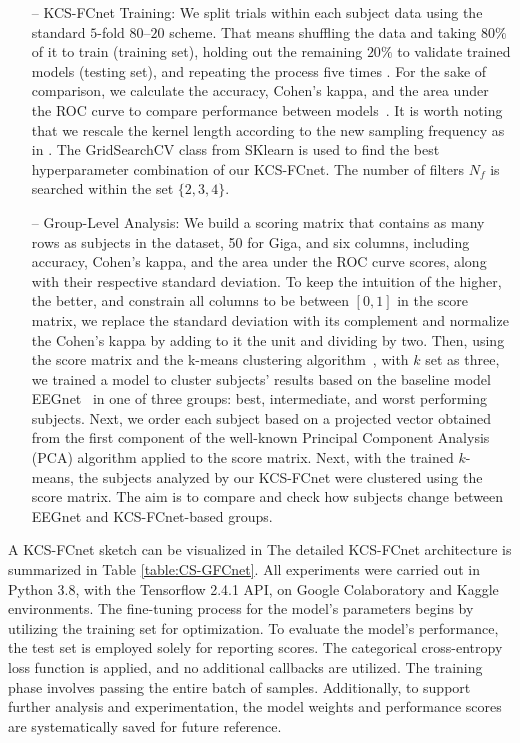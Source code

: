 \begin{itemize}
    \item[--] {{KCS-FCnet Training:}} We split trials within each subject data using the standard $5$-{fold} $80${--}$20$ scheme. That means shuffling the data and taking $80\%$ of it to train (training set), holding out the remaining $20\%$ to validate trained models (testing set), and repeating the process five times \cite{schirrmeister2017deep}. For the sake of comparison, we calculate the accuracy, Cohen's kappa, and the area under the ROC curve to compare performance between models~\cite{warrens2015five,geron2022hands}. It is worth noting that we rescale the kernel length according to the new sampling frequency as in \cite{lawhern2018eegnet}. The GridSearchCV class from SKlearn is used to find the best hyperparameter combination of our KCS-FCnet. The number of filters $N_f$ is searched within the set $\{2,3,4\}$.
    
    \item[--] {{Group-Level Analysis:}}  We build a scoring matrix that contains as many rows as subjects in the dataset, 50 for Giga, and six columns, including accuracy, Cohen's kappa, and the area under the ROC curve scores, along with their respective standard deviation. To keep the intuition of the higher, the better, and constrain all columns to be between $[0,1]$ in the score matrix, we replace the standard deviation with its complement and normalize the Cohen's kappa by adding to it the unit and dividing by two. Then, using the score matrix and the k-means clustering algorithm~\cite{geron2022hands}, with $k$ set as three, we trained a model to cluster subjects' results based on the baseline model EEGnet~\cite{lawhern2018eegnet} in one of three groups: best, intermediate, and worst performing subjects. Next, we order each subject based on a projected vector obtained from the first component of the well-known Principal Component Analysis (PCA) algorithm applied to the score matrix. Next, with the trained $k$-means, the subjects analyzed by our KCS-FCnet were clustered using the score matrix. The aim is to compare and check how subjects change between EEGnet and KCS-FCnet-based groups. 
\end{itemize}    
	
A KCS-FCnet sketch can be visualized in  The detailed KCS-FCnet architecture is summarized in Table \ref{table:CS-GFCnet}. All experiments were carried out in{ Python 3.8}, with the {Tensorflow 2.4.1 API}, on Google Colaboratory and Kaggle environments. The fine-tuning process for the model's parameters begins by utilizing the training set for optimization. To evaluate the model's performance, the test set is employed solely for reporting scores. The categorical cross-entropy loss function is applied, and no additional callbacks are utilized. The training phase involves passing the entire batch of samples. Additionally, to support further analysis and experimentation, the model weights and performance scores are systematically saved for future reference.

